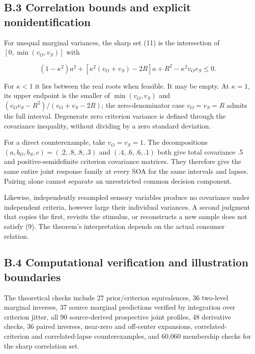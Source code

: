 \documentclass[
  11pt,
]{article}
\let\ctdoldsubsection\subsection
\renewcommand{\subsection}{\Needspace{6\baselineskip}\ctdoldsubsection}
\begin{document}
\hypertarget{b.3-correlation-bounds-and-explicit-nonidentification}{%
\subsection{B.3 Correlation bounds and explicit
nonidentification}\label{b.3-correlation-bounds-and-explicit-nonidentification}}

For unequal marginal variances, the sharp set (11) is the intersection
of \([0,\min(v_O,v_S)]\) with

\[
(1-\kappa^2)a^2+
[\kappa^2(v_O+v_S)-2R]a+
R^2-\kappa^2v_Ov_S\leq0.
\tag{B5}
\]

For \(\kappa<1\) it lies between the real roots when feasible. It may be
empty. At \(\kappa=1\), its upper endpoint is the smaller of
\(\min(v_O,v_S)\) and \((v_Ov_S-R^2)/(v_O+v_S-2R)\); the
zero-denominator case \(v_O=v_S=R\) admits the full interval. Degenerate
zero criterion variance is defined through the covariance inequality,
without dividing by a zero standard deviation.

For a direct counterexample, take \(v_O=v_S=1\). The decompositions
\((a,b_O,b_S,c)=(.2,.8,.8,.3)\) and \((.4,.6,.6,.1)\) both give total
covariance .5 and positive-semidefinite criterion covariance matrices.
They therefore give the same entire joint response family at every SOA
for the same intervals and lapses. Pairing alone cannot separate an
unrestricted common decision component.

Likewise, independently resampled sensory variables produce no
covariance under independent criteria, however large their individual
variances. A second judgment that copies the first, revisits the
stimulus, or reconstructs a new sample does not satisfy (9). The
theorem's interpretation depends on the actual consumer relation.

\hypertarget{b.4-computational-verification-and-illustration-boundaries}{%
\subsection{B.4 Computational verification and illustration
boundaries}\label{b.4-computational-verification-and-illustration-boundaries}}

The theoretical checks include 27 prior/criterion equivalences, 36
two-level marginal inverses, 37 source marginal predictions verified by
integration over criterion jitter, all 90 source-derived prospective
joint profiles, 48 derivative checks, 36 paired inverses, near-zero and
off-center expansions, correlated-criterion and correlated-lapse
counterexamples, and 60,060 membership checks for the sharp correlation
set.
\end{document}
